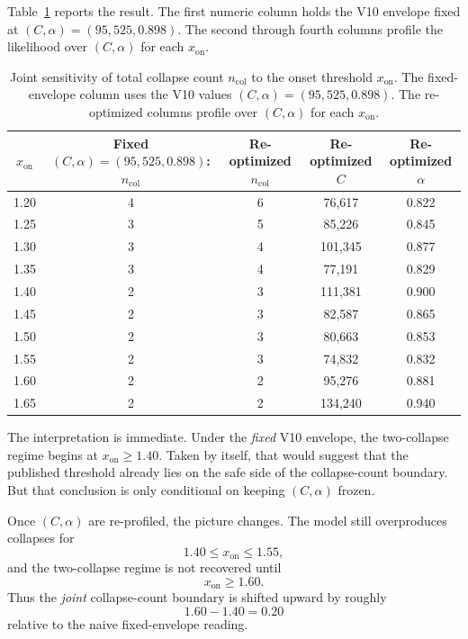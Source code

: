 \documentclass[11pt]{article}
\newcommand{\xon}{x_{\mathrm{on}}}
\begin{document}
Table~\ref{tab:S3joint} reports the result. The first numeric column holds the V10 envelope fixed at $(C,\alpha)=(95{,}525,0.898)$. The second through fourth columns profile the likelihood over $(C,\alpha)$ for each $\xon$.

\begin{table}[t]
\centering
\footnotesize
\caption{Joint sensitivity of total collapse count \(n_{\mathrm{col}}\) to the onset threshold \(\xon\). The fixed-envelope column uses the V10 values \((C,\alpha)=(95{,}525,0.898)\). The re-optimized columns profile over \((C,\alpha)\) for each \(\xon\).}
\label{tab:S3joint}
\begin{tabular}{ccccc}
\toprule
$\xon$ & Fixed $(C,\alpha)=(95{,}525,0.898)$: $n_{\mathrm{col}}$ & Re-optimized $n_{\mathrm{col}}$ & Re-optimized $C$ & Re-optimized $\alpha$ \\
\midrule
1.20 & 4 & 6 & 76{,}617 & 0.822 \\
1.25 & 3 & 5 & 85{,}226 & 0.845 \\
1.30 & 3 & 4 & 101{,}345 & 0.877 \\
1.35 & 3 & 4 & 77{,}191 & 0.829 \\
1.40 & 2 & 3 & 111{,}381 & 0.900 \\
1.45 & 2 & 3 & 82{,}587 & 0.865 \\
1.50 & 2 & 3 & 80{,}663 & 0.853 \\
1.55 & 2 & 3 & 74{,}832 & 0.832 \\
1.60 & 2 & 2 & 95{,}276 & 0.881 \\
1.65 & 2 & 2 & 134{,}240 & 0.940 \\
\bottomrule
\end{tabular}
\end{table}

The interpretation is immediate. Under the \emph{fixed} V10 envelope, the two-collapse regime begins at $\xon\ge 1.40$. Taken by itself, that would suggest that the published threshold already lies on the safe side of the collapse-count boundary. But that conclusion is only conditional on keeping $(C,\alpha)$ frozen.

Once $(C,\alpha)$ are re-profiled, the picture changes. The model still overproduces collapses for
\begin{equation}
1.40 \le \xon \le 1.55,
\end{equation}
and the two-collapse regime is not recovered until
\begin{equation}
\xon \ge 1.60.
\end{equation}
Thus the \emph{joint} collapse-count boundary is shifted upward by roughly
\begin{equation}
1.60 - 1.40 = 0.20
\end{equation}
relative to the naive fixed-envelope reading.
\end{document}
